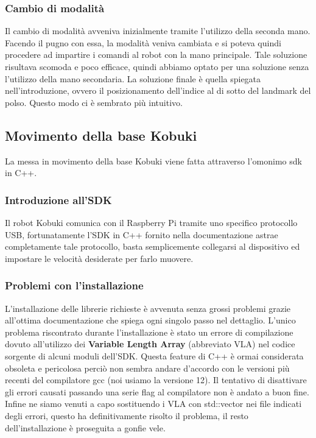 \documentclass[]{article}
\begin{document}
\subsubsection{Cambio di modalità}
Il cambio di modalità avveniva inizialmente tramite l'utilizzo della seconda mano. Facendo il pugno con essa, la modalità veniva cambiata e si poteva quindi procedere ad impartire i comandi al robot con la mano principale. Tale soluzione risultava scomoda e poco efficace, quindi abbiamo optato per una soluzione senza l'utilizzo della mano secondaria. La soluzione finale è quella spiegata nell'introduzione, ovvero il posizionamento dell'indice al di sotto del landmark del polso.
Questo modo ci è sembrato più intuitivo.

\subsection{Movimento della base Kobuki}
La messa in movimento della base Kobuki viene fatta attraverso l'omonimo sdk in C++.

\subsubsection{Introduzione all'SDK}
Il robot Kobuki comunica con il Raspberry Pi tramite uno specifico protocollo USB, fortunatamente l'SDK in C++ fornito nella documentazione astrae completamente tale protocollo,
basta semplicemente collegarsi al dispositivo ed impostare le velocità desiderate per farlo muovere.

\subsubsection{Problemi con l'installazione}
L'installazione delle librerie richieste è avvenuta senza grossi problemi grazie all'ottima documentazione che spiega ogni singolo passo nel dettaglio.
L'unico problema riscontrato durante l'installazione è stato un errore di compilazione dovuto all'utilizzo dei \textbf{Variable Length Array}  (abbreviato VLA) nel codice
sorgente di alcuni moduli dell'SDK. Questa feature di C++ è ormai considerata obsoleta e pericolosa perciò non sembra andare d'accordo con le versioni più recenti del compilatore gcc
(noi usiamo la versione 12). Il tentativo di disattivare gli errori causati passando una serie flag al compilatore non è andato a buon fine. Infine ne siamo venuti a capo sostituendo i VLA con
std::vector nei file indicati degli errori, questo ha definitivamente risolto il problema, il resto dell'installazione è proseguita a gonfie vele. 
\end{document}
